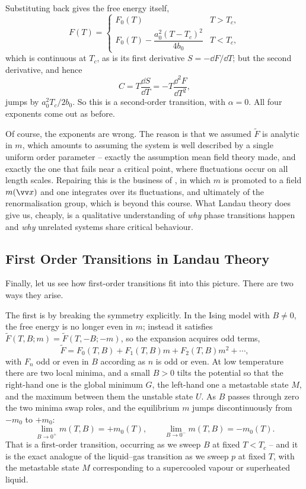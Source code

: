 Substituting back gives the free energy itself,
$$
F(T) = \begin{cases}F_0(T) & T > T_c,\\ F_0(T) - \dfrac{a_0^2(T-T_c)^2}{4b_0} & T< T_c,\end{cases}
$$
which is continuous at $T_c$, as is its first derivative $S = -\dd F/\dd T$; but the second derivative, and hence
$$
C = T\frac{\dd S}{\dd T} = -T\frac{\dd^2 F}{\dd T^2},
$$
jumps by $a_0^2 T_c/2b_0$. So this is a second-order transition, with $\alpha = 0$. All four exponents come out as before.

Of course, the exponents are wrong. The reason is that we assumed $\tilde F$ is analytic in $m$, which amounts to assuming the system is well described by a single uniform order parameter -- exactly the assumption mean field theory made, and exactly the one that fails near a critical point, where fluctuations occur on all length scales. Repairing this is the business of , in which $m$ is promoted to a field $m(\vv x)$ and one integrates over its fluctuations, and ultimately of the renormalisation group, which is beyond this course. What Landau theory does give us, cheaply, is a qualitative understanding of \emph{why} phase transitions happen and \emph{why} unrelated systems share critical behaviour.

\subsection{First Order Transitions in Landau Theory}

Finally, let us see how first-order transitions fit into this picture. There are two ways they arise.

The first is by breaking the symmetry explicitly. In the Ising model with $B \neq 0$, the free energy is no longer even in $m$; instead it satisfies $\tilde F(T,B;m) = \tilde F(T,-B;-m)$, so the expansion acquires odd terms,
$$
\tilde F = F_0(T,B) + F_1(T,B)m + F_2(T,B)m^2 + \cdots,
$$
with $F_n$ odd or even in $B$ according as $n$ is odd or even. At low temperature there are two local minima, and a small $B > 0$ tilts the potential so that the right-hand one is the global minimum $G$, the left-hand one a metastable state $M$, and the maximum between them the unstable state $U$. As $B$ passes through zero the two minima swap roles, and the equilibrium $m$ jumps discontinuously from $-m_0$ to $+m_0$:
$$
\lim_{B\to0^+}m(T,B) = +m_0(T), \qquad \lim_{B\to 0^-}m(T,B) = -m_0(T).
$$
That is a first-order transition, occurring as we sweep $B$ at fixed $T < T_c$ -- and it is the exact analogue of the liquid--gas transition as we sweep $p$ at fixed $T$, with the metastable state $M$ corresponding to a supercooled vapour or superheated liquid.

